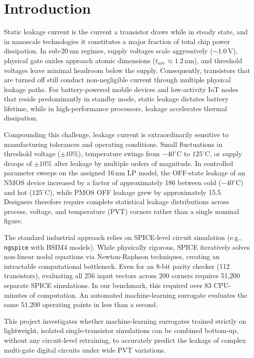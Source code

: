 \documentclass[11pt,a4paper]{article}
\numberwithin{table}{section}
\numberwithin{figure}{section}
\begin{document}
\newpage
\begingroup
\setlength{\parskip}{0pt}
\tableofcontents
\endgroup
\newpage

\section{Introduction}
Static leakage current is the current a transistor draws while in steady state, and in nanoscale technologies it constitutes a major fraction of total chip power dissipation. In sub-20\,nm regimes, supply voltages scale aggressively ($\sim 1.0\,\mathrm{V}$), physical gate oxides approach atomic dimensions ($t_{oxe} \approx 1.2\,\mathrm{nm}$), and threshold voltages leave minimal headroom below the supply. Consequently, transistors that are turned off still conduct non-negligible current through multiple physical leakage paths. For battery-powered mobile devices and low-activity IoT nodes that reside predominantly in standby mode, static leakage dictates battery lifetime, while in high-performance processors, leakage accelerates thermal dissipation.

Compounding this challenge, leakage current is extraordinarily sensitive to manufacturing tolerances and operating conditions. Small fluctuations in threshold voltage ($\pm 10\%$), temperature swings from $-40^\circ\mathrm{C}$ to $125^\circ\mathrm{C}$, or supply droops of $\pm 10\%$ alter leakage by multiple orders of magnitude. In controlled parameter sweeps on the assigned 16\,nm LP model, the OFF-state leakage of an NMOS device increased by a factor of approximately 186 between cold ($-40^\circ\mathrm{C}$) and hot ($125^\circ\mathrm{C}$), while PMOS OFF leakage grew by approximately 15.5. Designers therefore require complete statistical leakage distributions across process, voltage, and temperature (PVT) corners rather than a single nominal figure.

The standard industrial approach relies on SPICE-level circuit simulation (e.g., \texttt{ngspice} with BSIM4 models). While physically rigorous, SPICE iteratively solves non-linear nodal equations via Newton-Raphson techniques, creating an intractable computational bottleneck. Even for an 8-bit parity checker (112 transistors), evaluating all 256 input vectors across 200 corners requires 51,200 separate SPICE simulations. In our benchmark, this required over 83 CPU-minutes of computation. An automated machine-learning surrogate evaluates the same 51,200 operating points in less than a second.

This project investigates whether machine-learning surrogates trained strictly on lightweight, isolated single-transistor simulations can be combined bottom-up, without any circuit-level retraining, to accurately predict the leakage of complex multi-gate digital circuits under wide PVT variations.
\end{document}
